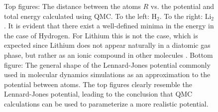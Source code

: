 \begin{figure}
 \begin{center}
  \caption{Top figures: The distance between the atoms $R$ vs. the potential and total energy calculated using QMC. To the left: $\mathrm{H_2}$. To the right: $\mathrm{Li_2}$. It is evident that there exist a well-defined minima in the energy in the case of Hydrogen. For Lithium this is not the case, which is expected since Lithium does not appear naturally in a diatomic gas phase, but rather as an ionic compound in other molecules \cite{UniversityPhysics}. Bottom figure: The general shape of the Lennard-Jones potential commonly used in molecular dynamics simulations as an approximation to the potential between atoms. The top figures clearly resemble the Lennard-Jones potential, leading to the conclusion that QMC calculations can be used to parameterize a more realistic potential.}

\end{center}
\end{figure}
